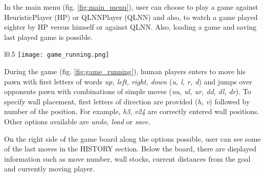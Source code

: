 In the main menu (fig. \ref{fig:main_menu}), user can choose to play a game
against HeuristicPlayer (HP) or QLNNPlayer (QLNN) and also, to watch a game
played eighter by HP versus himself or against QLNN. Also, loading a game and
saving last played game is possible.

\begin{wrapfigure}{l}{0.5\textwidth}
  \vspace*{-0.35cm}
  \centering
  \texttt{[image: game\_running.png]}
  \vspace*{-0.30cm}
  \caption{game running}
  \label{fig:game_running}
  \vspace*{-0.60cm}
\end{wrapfigure}

During the game (fig. \ref{fig:game_running}), human players enters to move his
pawn with first letters of words \textit{up, left, right, down}
(\textit{u, l, r, d}) and jumps over opponents pawn with combinations of simple
moves (\textit{uu, ul, ur, dd, dl, dr}). To specify wall placement, first
letters of direction are provided (\textit{h, v}) followed by number
of the position.  For example, \textit{h3}, \textit{v24} are correctly entered
wall positions. Other options available are \textit{undo, load} or
\textit{save}.

On the right side of the game board along the options possible, user can see
some of the last moves in the HISTORY section. Below the board, there are
displayed information such as move number, wall stocks, current distances from
the goal and currently moving player.


% 
% 

